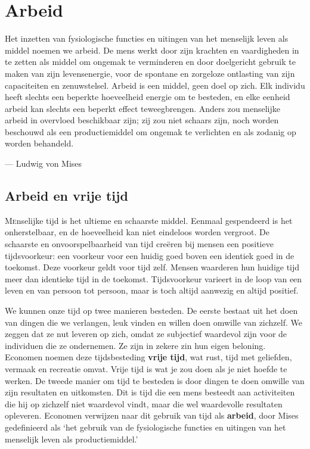 \chapter{Arbeid}
\begin{blockquotebox}
    Het inzetten van fysiologische functies en uitingen van het menselijk leven als middel noemen we arbeid. De mens werkt door zijn krachten en vaardigheden in te zetten als middel om ongemak te verminderen en door doelgericht gebruik te maken van zijn levensenergie, voor de spontane en zorgeloze  ontlasting van zijn capaciteiten en zenuwstelsel. Arbeid is een middel, geen doel op zich. Elk individu heeft slechts een beperkte hoeveelheid energie om te besteden, en elke eenheid arbeid kan slechts een beperkt effect teweegbrengen. Anders zou menselijke arbeid in overvloed beschikbaar zijn; zij zou niet schaars zijn, noch worden beschouwd als een productiemiddel om ongemak te verlichten en als zodanig op worden behandeld.\footnotemark \par\raggedleft--- Ludwig von Mises
\end{blockquotebox}

\section{Arbeid en vrije tijd}

\lettrine{M}enselijke tijd is het ultieme en schaarste middel. Eenmaal gespendeerd
is het onherstelbaar, en de hoeveelheid kan niet eindeloos worden
vergroot. De schaarste en onvoorspelbaarheid van tijd creëren bij mensen
een positieve tijdsvoorkeur: een voorkeur voor een huidig goed boven een
identiek goed in de toekomst. Deze voorkeur geldt voor tijd zelf. Mensen
waarderen hun huidige tijd meer dan identieke tijd in de toekomst.
Tijdsvoorkeur varieert in de loop van een leven en van persoon tot
persoon, maar is toch altijd aanwezig en altijd positief.

We kunnen onze tijd op twee manieren besteden. De eerste bestaat uit het
doen van dingen die we verlangen, leuk vinden en willen doen omwille van
zichzelf. We zeggen dat ze nut leveren op zich, omdat ze subjectief
waardevol zijn voor de individuen die ze ondernemen. Ze zijn in zekere
zin hun eigen beloning. Economen noemen deze tijdsbesteding
\textbf{vrije tijd}, wat rust, tijd met geliefden, vermaak en recreatie
omvat. Vrije tijd is wat je zou doen als je niet hoefde te werken. De
tweede manier om tijd te besteden is door dingen te doen omwille van
zijn resultaten en uitkomsten. Dit is tijd die een mens besteedt aan
activiteiten die hij op zichzelf niet waardevol vindt, maar die wel
waardevolle resultaten opleveren. Economen verwijzen naar dit gebruik
van tijd als \textbf{arbeid}, door Mises gedefinieerd als `het gebruik
van de fysiologische functies en uitingen van het menselijk leven als
productiemiddel.'\autocite{38}

